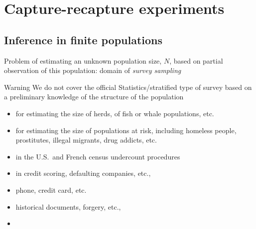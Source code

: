 \section{Capture-recapture experiments}
\begin{slide}
\tableofcontents[sectionstyle=show/hide,subsectionstyle=show/shaded/hide]

\end{slide}
\subsection{Inference in finite populations}
\begin{slide}

\normalsize 
Problem of estimating an unknown population size, $N$, based on
partial observation of this population: domain of {\em survey
sampling} 

\begin{block}{Warning}
We do not cover the official Statistics/stratified type of survey based on
a preliminary knowledge of the structure of the population
\end{block}

\end{slide}\begin{slide} 

\begin{itemize}
\item {} 
	for estimating the size of herds, of fish or whale populations, etc.
\pause
\item {} 
	for estimating the size of populations at risk, including 
	homeless people, prostitutes, illegal migrants, drug addicts, etc.
\pause
\item {} in the U.S.~and French census undercount procedures
\item {} in credit scoring, defaulting companies, etc.,
\pause
\item {}  phone, credit card, etc.
\item {} historical documents, forgery, etc.,
\item {}
\end{itemize}


\end{slide}
